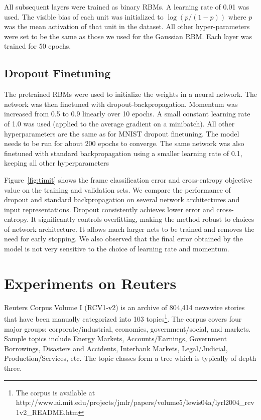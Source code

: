 \documentclass[12pt]{article}
\begin{document}
All subsequent layers were trained as binary RBMs. A learning rate of 0.01 was
used. The visible bias of each unit was initialized to $\log(p/(1-p))$ where $p$
was the mean activation of that unit in the dataset. All other hyper-parameters
were set to be the same as those we used for the Gaussian RBM. Each layer was trained for 50 epochs.

\subsection{Dropout Finetuning}
\label{sec:timit_dropout}
The pretrained RBMs were used to initialize the weights in a neural network. The
network was then finetuned with dropout-backpropagation.
Momentum was increased from 0.5 to 0.9 linearly over 10 epochs. A small constant learning
rate of 1.0 was used (applied to the average gradient on a minibatch). All other hyperparameters
are the same as for MNIST dropout finetuning. The model needs to be run for
about 200 epochs to converge. The same network was also finetuned with standard
backpropagation using a smaller learning rate of 0.1, keeping all other
hyperparameters 

Figure~\ref{fig:timit} shows the frame classification error and cross-entropy
objective value on the training and validation sets. We compare the performance
of dropout and standard backpropagation on several network architectures and
input representations. Dropout consistently achieves lower error and
cross-entropy. It significantly controls overfitting, making the method robust
to choices of network architecture. It allows much larger nets to be trained and removes
the need for early stopping. We also observed that the final error obtained by
the model is not very sensitive to the choice of learning rate and momentum.

\section{Experiments on Reuters}
\label{reuterssom}

Reuters Corpus Volume I (RCV1-v2) \cite{Lewis2004} is an archive of 
804,414 newswire stories that have been manually categorized into 103 topics\footnote{The corpus is
available at http://www.ai.mit.edu/projects/jmlr/papers/volume5/lewis04a/lyrl2004\_rcv1v2\_README.htm}. 
The corpus 
covers four major groups: corporate/industrial, economics, government/social, and markets. 
Sample topics include Energy Markets, Accounts/Earnings, Government Borrowings, Disasters and 
Accidents, Interbank Markets, Legal/Judicial, Production/Services, etc. The topic classes form 
a tree which is typically of depth three.
\end{document}
